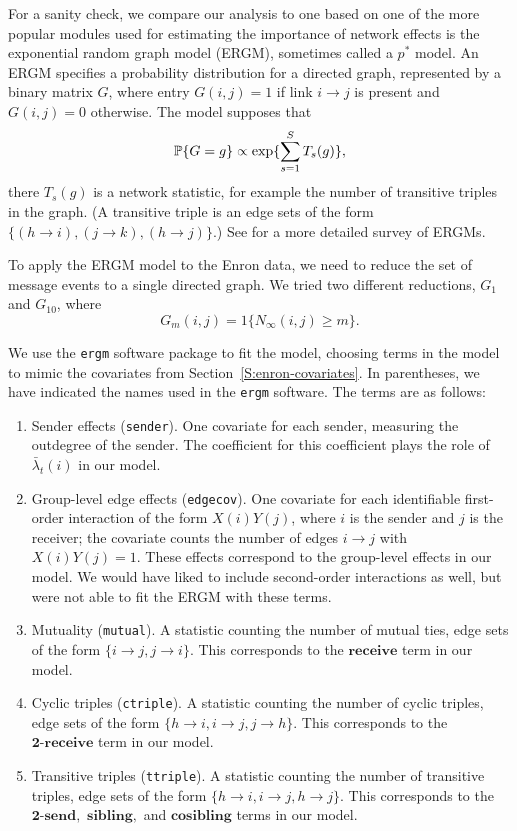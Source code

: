 \documentclass[final]{statsoc}
\begin{document}
For a sanity check, we compare our analysis to one based on one of the more
popular modules used for estimating the importance of network effects is the
exponential random graph model (ERGM), sometimes called a $p^\ast$ model.
An ERGM specifies a probability
distribution for a directed graph, represented by a binary matrix $G$, where
entry $G(i,j) = 1$ if link $i \to j$ is present and $G(i,j) = 0$ otherwise.
The model supposes that \[ \mathbb{P}\{ G = g \} \propto \exp\{ \sum_{s=1}^S T_s(g)
\}, \] there $T_s(g)$ is a network statistic, for example the number of
transitive triples in the graph.  (A transitive triple is an edge sets of the
form $\{ (h \to i), (j \to k), (h \to j) \}$.)
See \cite{anderson1999pstar} for a more detailed survey of ERGMs.

To apply the ERGM model to the Enron data, we need to reduce the set of
message events to a single directed graph.  We tried two different reductions,
$G_1$ and $G_{10}$, where
\[
  G_m(i,j) = 1\{ N_\infty(i,j) \geq m \}.
\]

We use the \texttt{ergm} software package to fit the model, choosing
terms in the model to mimic the covariates from
Section~\ref{S:enron-covariates}.  In parentheses, we have indicated the
names used in the \texttt{ergm} software.  The terms are as follows:
\begin{enumerate}
  \item Sender effects (\texttt{sender}).  One covariate for each sender,
  measuring the outdegree of the sender.  The coefficient for this coefficient
plays the role of $\bar \lambda_t(i)$ in our model.

  \item Group-level edge effects (\texttt{edgecov}).  One covariate for each
identifiable first-order interaction of the form $X(i) Y(j)$, where $i$ is the
sender and $j$ is the receiver; the covariate counts the number of edges $i
\to j$ with $X(i) Y(j) = 1$.  These effects correspond to the group-level
effects in our model.  We would have liked to include second-order
interactions as well, but were not able to fit the ERGM with these terms.

  \item Mutuality (\texttt{mutual}).  A statistic counting the number of
mutual ties, edge sets of the form $\{ i \to j, j \to i \}$.  This corresponds to the
$\textbf{receive}$ term in our model.

  \item Cyclic triples (\texttt{ctriple}).  A statistic counting the number of
cyclic triples, edge sets of the form $\{ h \to i, i \to j, j \to h \}$.  This
corresponds to the $\textbf{2-receive}$ term in our model.

  \item Transitive triples (\texttt{ttriple}).  A statistic counting the
number of transitive triples, edge sets of the form $\{ h \to i, i \to j, h
\to j \}$.  This corresponds to the $\textbf{2-send},$ $\textbf{sibling},$
and $\textbf{cosibling}$ terms in our model.
\end{enumerate}
\end{document}
